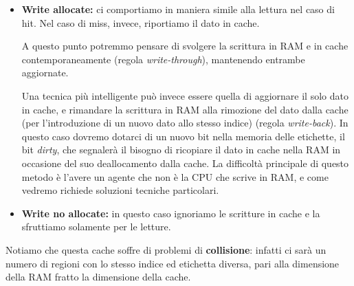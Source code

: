 \documentclass[a4paper,11pt]{article}
\begin{document}
\begin{itemize}
	\item \textbf{Write allocate:}
ci comportiamo in maniera simile alla lettura nel caso di hit.
Nel caso di miss, invece, riportiamo il dato in cache.

A questo punto potremmo pensare di svolgere la scrittura in RAM e in cache contemporaneamente (regola \textit{write-through}), mantenendo entrambe aggiornate.

Una tecnica più intelligente può invece essere quella di aggiornare il solo dato in cache, e rimandare la scrittura in RAM alla rimozione del dato dalla cache (per l'introduzione di un nuovo dato allo stesso indice) (regola \textit{write-back}).
In questo caso dovremo dotarci di un nuovo bit nella memoria delle etichette, il bit \textit{dirty}, che segnalerà il bisogno di ricopiare il dato in cache nella RAM in occasione del suo deallocamento dalla cache.
La difficoltà principale di questo metodo è l'avere un agente che non è la CPU che scrive in RAM, e come vedremo richiede soluzioni tecniche particolari.

\item \textbf{Write no allocate:}
in questo caso ignoriamo le scritture in cache e la sfruttiamo solamente per le letture.

\end{itemize}

\par\smallskip

Notiamo che questa cache soffre di problemi di \textbf{collisione}: infatti ci sarà un numero di regioni con lo stesso indice ed etichetta diversa, pari alla dimensione della RAM fratto la dimensione della cache.
\end{document}
